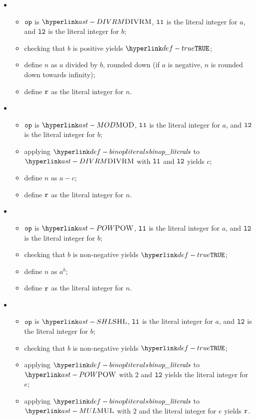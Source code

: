\begin{itemize}
  \item {}
  \begin{itemize}
    \item $\texttt{op}$ is $\DIVRM$, $\texttt{l1}$ is the literal integer for $a$, and $\texttt{l2}$ is the literal integer for $b$;
    \item checking that $b$ is positive yields $\True$\ProseOrTypeError;
    \item define $n$ as $a$ divided by $b$, rounded down (if $a$ is negative, $n$ is rounded down towards infinity);
    \item define $\texttt{r}$ as the literal integer for $n$.
  \end{itemize}

  \item {}
  \begin{itemize}
    \item $\texttt{op}$ is $\MOD$, $\texttt{l1}$ is the literal integer for $a$, and $\texttt{l2}$ is the literal integer for $b$;
    \item applying $\binopliterals$ to $\DIVRM$ with $\texttt{l1}$ and $\texttt{l2}$ yields $c$\ProseOrTypeError;
    \item define $n$ as $a-c$;
    \item define $\texttt{r}$ as the literal integer for $n$.
  \end{itemize}

  \item {}
  \begin{itemize}
    \item $\texttt{op}$ is $\POW$, $\texttt{l1}$ is the literal integer for $a$, and $\texttt{l2}$ is the literal integer for $b$;
    \item checking that $b$ is non-negative yields $\True$\ProseOrTypeError;
    \item define $n$ as $a^b$;
    \item define $\texttt{r}$ as the literal integer for $n$.
  \end{itemize}

  \item {}
  \begin{itemize}
    \item $\texttt{op}$ is $\SHL$, $\texttt{l1}$ is the literal integer for $a$, and $\texttt{l2}$ is the literal integer for $b$;
    \item checking that $b$ is non-negative yields $\True$\ProseOrTypeError;
    \item applying $\binopliterals$ to $\POW$ with $2$ and $\texttt{l2}$ yields the literal integer for $e$;
    \item applying $\binopliterals$ to $\MUL$ with $2$ and the literal integer for $e$ yields $\texttt{r}$.
  \end{itemize}


\end{itemize}
